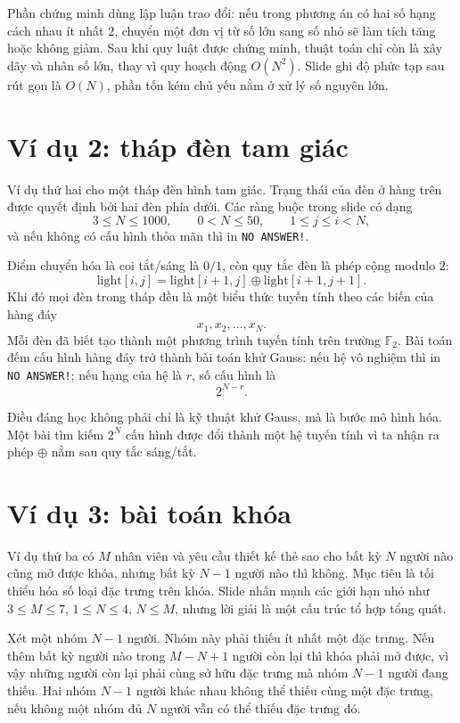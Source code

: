 \documentclass[11pt]{article}
\begin{document}
Phần chứng minh dùng lập luận trao đổi: nếu trong phương án có hai số hạng
cách nhau ít nhất \(2\), chuyển một đơn vị từ số lớn sang số nhỏ sẽ làm tích
tăng hoặc không giảm. Sau khi quy luật được chứng minh, thuật toán chỉ còn là
xây dãy và nhân số lớn, thay vì quy hoạch động \(O(N^2)\). Slide ghi độ phức
tạp sau rút gọn là \(O(N)\), phần tốn kém chủ yếu nằm ở xử lý số nguyên lớn.

\section{Ví dụ 2: tháp đèn tam giác}

Ví dụ thứ hai cho một tháp đèn hình tam giác. Trạng thái của đèn ở hàng trên
được quyết định bởi hai đèn phía dưới. Các ràng buộc trong slide có dạng
\[
  3\le N\le1000,\qquad 0<N\le50,\qquad 1\le j\le i<N,
\]
và nếu không có cấu hình thỏa mãn thì in \texttt{NO ANSWER!}.

Điểm chuyển hóa là coi tắt/sáng là \(0/1\), còn quy tắc đèn là phép cộng
modulo \(2\):
\[
  \text{light}[i,j]=
  \text{light}[i+1,j]\oplus\text{light}[i+1,j+1].
\]
Khi đó mọi đèn trong tháp đều là một biểu thức tuyến tính theo các biến của
hàng đáy
\[
  x_1,x_2,\ldots,x_N.
\]
Mỗi đèn đã biết tạo thành một phương trình tuyến tính trên trường
\(\mathbb F_2\). Bài toán đếm cấu hình hàng đáy trở thành bài toán khử Gauss:
nếu hệ vô nghiệm thì in \texttt{NO ANSWER!}; nếu hạng của hệ là \(r\), số
cấu hình là
\[
  2^{N-r}.
\]

Điều đáng học không phải chỉ là kỹ thuật khử Gauss, mà là bước mô hình hóa.
Một bài tìm kiếm \(2^N\) cấu hình được đổi thành một hệ tuyến tính vì ta nhận
ra phép \(\oplus\) nằm sau quy tắc sáng/tắt.

\section{Ví dụ 3: bài toán khóa}

Ví dụ thứ ba có \(M\) nhân viên và yêu cầu thiết kế thẻ sao cho bất kỳ \(N\)
người nào cũng mở được khóa, nhưng bất kỳ \(N-1\) người nào thì không. Mục
tiêu là tối thiểu hóa số loại đặc trưng trên khóa. Slide nhấn mạnh các giới
hạn nhỏ như \(3\le M\le7\), \(1\le N\le4\), \(N\le M\), nhưng lời giải là một
cấu trúc tổ hợp tổng quát.

Xét một nhóm \(N-1\) người. Nhóm này phải thiếu ít nhất một đặc trưng. Nếu
thêm bất kỳ người nào trong \(M-N+1\) người còn lại thì khóa phải mở được,
vì vậy những người còn lại phải cùng sở hữu đặc trưng mà nhóm \(N-1\) người
đang thiếu. Hai nhóm \(N-1\) người khác nhau không thể thiếu cùng một đặc
trưng, nếu không một nhóm đủ \(N\) người vẫn có thể thiếu đặc trưng đó.
\end{document}
